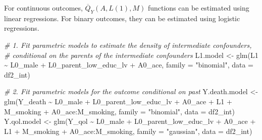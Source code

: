 \documentclass[
]{book}
\newenvironment{Shaded}{\begin{snugshade}}{\end{snugshade}}
\newcommand{\AttributeTok}[1]{\textcolor[rgb]{0.77,0.63,0.00}{#1}}
\newcommand{\CommentTok}[1]{\textcolor[rgb]{0.56,0.35,0.01}{\textit{#1}}}
\newcommand{\FunctionTok}[1]{\textcolor[rgb]{0.00,0.00,0.00}{#1}}
\newcommand{\NormalTok}[1]{#1}
\newcommand{\OtherTok}[1]{\textcolor[rgb]{0.56,0.35,0.01}{#1}}
\newcommand{\SpecialCharTok}[1]{\textcolor[rgb]{0.00,0.00,0.00}{#1}}
\newcommand{\StringTok}[1]{\textcolor[rgb]{0.31,0.60,0.02}{#1}}
\begin{document}
For continuous outcomes, \(\overline{Q}_Y(A,L(1),M)\) functions can be estimated using linear regressions. For binary outcomes, they can be estimated using logistic regressions.

\begin{Shaded}
\begin{Highlighting}[]
\CommentTok{\# 1. Fit parametric models to estimate the density of intermediate confounders, }
\CommentTok{\#    conditional on the parents of the intermediate confounders}
\NormalTok{L1.model }\OtherTok{\textless{}{-}} \FunctionTok{glm}\NormalTok{(L1 }\SpecialCharTok{\textasciitilde{}}\NormalTok{ L0\_male }\SpecialCharTok{+}\NormalTok{ L0\_parent\_low\_educ\_lv }\SpecialCharTok{+}\NormalTok{ A0\_ace, }
                \AttributeTok{family =} \StringTok{"binomial"}\NormalTok{, }\AttributeTok{data =}\NormalTok{ df2\_int)}

\CommentTok{\# 2. Fit parametric models for the outcome conditional on past}
\NormalTok{Y.death.model }\OtherTok{\textless{}{-}} \FunctionTok{glm}\NormalTok{(Y\_death }\SpecialCharTok{\textasciitilde{}}\NormalTok{ L0\_male }\SpecialCharTok{+}\NormalTok{ L0\_parent\_low\_educ\_lv }\SpecialCharTok{+}\NormalTok{ A0\_ace }\SpecialCharTok{+}\NormalTok{ L1 }\SpecialCharTok{+} 
\NormalTok{                                  M\_smoking }\SpecialCharTok{+}\NormalTok{ A0\_ace}\SpecialCharTok{:}\NormalTok{M\_smoking, }
                      \AttributeTok{family =} \StringTok{"binomial"}\NormalTok{, }\AttributeTok{data =}\NormalTok{ df2\_int)}
\NormalTok{Y.qol.model }\OtherTok{\textless{}{-}} \FunctionTok{glm}\NormalTok{(Y\_qol }\SpecialCharTok{\textasciitilde{}}\NormalTok{ L0\_male }\SpecialCharTok{+}\NormalTok{ L0\_parent\_low\_educ\_lv }\SpecialCharTok{+}\NormalTok{ A0\_ace }\SpecialCharTok{+}\NormalTok{ L1 }\SpecialCharTok{+} 
\NormalTok{                              M\_smoking }\SpecialCharTok{+}\NormalTok{ A0\_ace}\SpecialCharTok{:}\NormalTok{M\_smoking, }
                    \AttributeTok{family =} \StringTok{"gaussian"}\NormalTok{, }\AttributeTok{data =}\NormalTok{ df2\_int)}


\end{Highlighting}
\end{Shaded}
\end{document}
